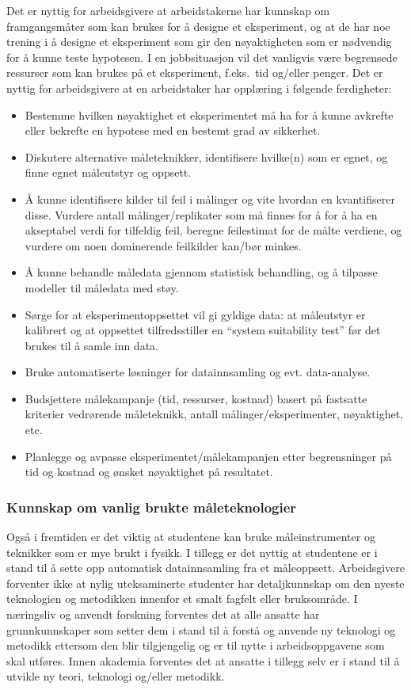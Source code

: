 \documentclass{article}
\begin{document}
Det er nyttig for arbeidsgivere at arbeidstakerne har kunnskap om framgangsmåter som kan brukes for å designe et eksperiment, og at de har noe trening i å designe et eksperiment som gir den nøyaktigheten som er nødvendig for å kunne teste hypotesen. I en jobbsituasjon vil det vanligvis være begrensede ressurser som kan brukes på et eksperiment, f.eks.~tid og/eller penger.
Det er nyttig for arbeidsgivere at en arbeidstaker har opplæring i følgende ferdigheter:
\begin{itemize}
  \item Bestemme hvilken nøyaktighet et eksperimentet må ha for å kunne avkrefte eller bekrefte en hypotese med en bestemt grad av sikkerhet.
  \item Diskutere alternative måleteknikker, identifisere hvilke(n) som er egnet, og finne egnet måleutstyr og oppsett.
  \item Å kunne identifisere kilder til feil i målinger og vite hvordan en kvantifiserer disse. Vurdere antall målinger/replikater som må finnes for å for å ha en akseptabel verdi for tilfeldig feil, beregne feilestimat for de målte verdiene, og vurdere om noen dominerende feilkilder kan/bør minkes.
  \item Å kunne behandle måledata gjennom statistisk behandling, og å tilpasse modeller til måledata med støy.
  \item Sørge for at eksperimentoppsettet vil gi gyldige data: at måleutstyr er kalibrert og at oppsettet tilfredsstiller en ``system suitability test'' før det brukes til å samle inn data.
  \item Bruke automatiserte løsninger for datainnsamling og evt. data-analyse.
  \item Budsjettere målekampanje (tid, ressurser, kostnad) basert på fastsatte kriterier vedrørende måleteknikk, antall målinger/eksperimenter, nøyaktighet, etc.
  \item Planlegge og avpasse eksperimentet/målekampanjen etter begrensninger på tid og kostnad og ønsket nøyaktighet på resultatet.
\end{itemize}

\subsubsection{Kunnskap om vanlig brukte måleteknologier}
Også i fremtiden er det viktig at studentene kan bruke måleinstrumenter og teknikker som er mye brukt i fysikk. I tillegg er det nyttig at studentene er i stand til å sette opp automatisk datainnsamling fra et måleoppsett.
Arbeidsgivere forventer ikke at nylig uteksaminerte studenter har detaljkunnskap om den nyeste teknologien og metodikken innenfor et smalt fagfelt eller bruksområde.
I næringsliv og anvendt forskning forventes det at alle ansatte har grunnkunnskaper som setter dem i stand til å forstå og anvende ny teknologi og metodikk ettersom den blir tilgjengelig og er til nytte i arbeidsoppgavene som skal utføres.
Innen akademia forventes det at ansatte i tillegg selv er i stand til å utvikle ny teori, teknologi og/eller metodikk.
\end{document}
